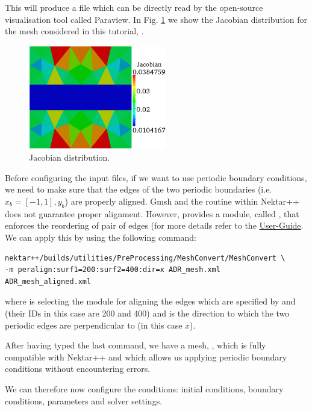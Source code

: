 This will produce a  file which can be directly read by the open-source 
visualisation tool called Paraview. In Fig. \ref{f:Jac} we show the Jacobian distribution for the 
mesh considered in this tutorial, .
%
\begin{figure}[h!]
\begin{center}
\includegraphics[width=6cm]{Figures/ADR_mesh_jacobian.png}
\caption{Jacobian distribution.}
\label{f:Jac}
\end{center}
\end{figure}
%
Before configuring the input files, if we want to use periodic boundary conditions, we 
need to make sure that the edges of the two periodic boundaries (i.e. $x_{b} = [-1, 1],
y_{b}$) are properly aligned. Gmsh and the  routine within Nektar++ 
does not guarantee proper alignment. However,  provides a module, 
called , that enforces the reordering of pair of edges (for more details 
refer to the \href{http://www.nektar.info/downloads/8}{User-Guide}. 
We can apply this by using the following command:
%
\begin{lstlisting}[style=BashInputStyle]
nektar++/builds/utilities/PreProcessing/MeshConvert/MeshConvert \
-m peralign:surf1=200:surf2=400:dir=x ADR_mesh.xml ADR_mesh_aligned.xml
\end{lstlisting}
%
where  is selecting the module for aligning the edges which are 
specified by \inltt{surf1} and \inltt{surf2} (their IDs in this case are 200 and 400) 
and \inltt{dir} is the direction to which the two periodic edges are perpendicular 
to (in this case $x$).

After having typed the last command, we have a mesh, ,
which is fully compatible with Nektar++ and which allows us applying periodic boundary 
conditions without encountering errors. 

We can therefore now configure the conditions: initial conditions, boundary conditions, 
parameters and solver settings. 

